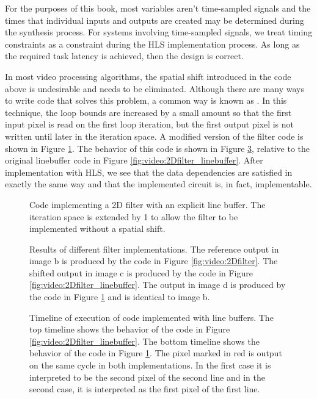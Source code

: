 For the purposes of this book, most variables aren't time-sampled signals and the times that individual inputs and outputs are created may be determined during the synthesis process.  For systems involving time-sampled signals, we treat timing constraints as a constraint during the HLS implementation process.  As long as the required task latency is achieved, then the design is correct.

In most video processing algorithms, the spatial shift introduced in the code above is undesirable and needs to be eliminated.  Although there are many ways to write code that solves this problem, a common way is known as .  In this technique, the loop bounds are increased by a small amount so that the first input pixel is read on the first loop iteration, but the first output pixel is not written until later in the iteration space.  A modified version of the filter code is shown in Figure \ref{fig:video:2Dfilter_linebuffer_extended}.  The behavior of this code is shown in Figure \ref{fig:video:timelines}, relative to the original linebuffer code in Figure \ref{fig:video:2Dfilter_linebuffer}.  After implementation with HLS, we see that the data dependencies are satisfied in exactly the same way and that the implemented circuit is, in fact, implementable.

\begin{figure}
{\tiny }
\caption{Code implementing a 2D filter with an explicit line buffer.  The iteration space is extended by 1 to allow the filter to be implemented without a spatial shift.}\label{fig:video:2Dfilter_linebuffer_extended}
\end{figure}

\begin{figure}
\centering
{\tiny }
\caption{Results of different filter implementations. The reference output in image b is produced by the code in Figure \ref{fig:video:2Dfilter}.  The shifted output in image c is produced by the code in Figure \ref{fig:video:2Dfilter_linebuffer}.  The output in image d is produced by the code in Figure \ref{fig:video:2Dfilter_linebuffer_extended} and is identical to image b.}\label{fig:video:filter2D_results_withshifting}
\end{figure}

\begin{figure}
\centering
{\tiny }
\caption{Timeline of execution of code implemented with line buffers.  The top timeline shows the behavior of the code in  Figure \ref{fig:video:2Dfilter_linebuffer}.  The bottom timeline shows the behavior of the code in  Figure \ref{fig:video:2Dfilter_linebuffer_extended}.  The pixel marked in red is output on the same cycle in both implementations.  In the first case it is interpreted to be the second pixel of the second line and in the second case, it is interpreted as the first pixel of the first line.}\label{fig:video:timelines}
\end{figure}

